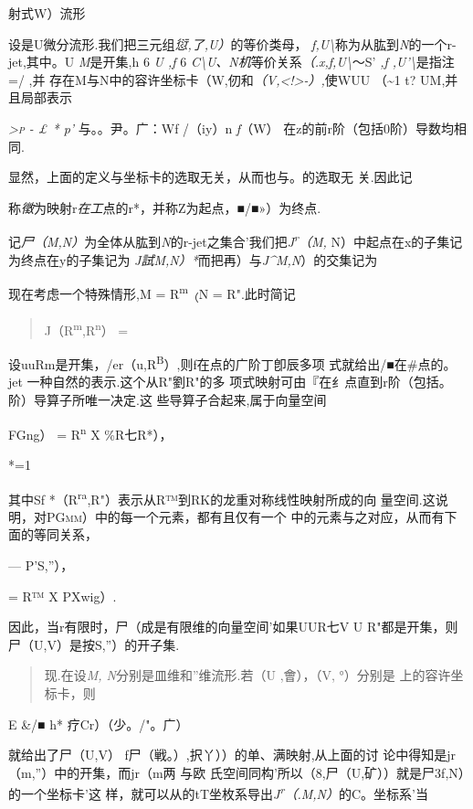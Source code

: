 射式W）流形

设是U微分流形.我们把三元组\emph{愆,了,U）}的等价类母，
\emph{f,U\textbackslash{}}称为从肱到\emph{N}的一个r-jet,其中。U
\emph{M}是开集,h 6 \emph{U ,f} 6
\emph{C\textbackslash{}U、N机}等价关系\emph{（.x,f,U\textbackslash{}}〜S'
\emph{,f ,U'\textbackslash{}}是指注=/ ,并
存在M与N中的容许坐标卡（W,仞和\emph{（V,\textless{}!\textgreater{}-）,}使WUU
（\textasciitilde{}1 t? UM,并且局部表示

\emph{\textsc{\textgreater{}p} - £ * p'} 与。。尹。广：Wf /（iy）n
\emph{f}（W） 在z的前r阶（包括0阶）导数均相同.

显然，上面的定义与坐标卡的选取无关，从而也与。的选取无 关.因此记

称\emph{徵}为映射r\emph{在工}点的r*，并称Z为起点，■/■»）为终点.

记\emph{尸（M,N）}为全体从肱到\emph{N}的r-jet之集合'我们把\emph{J\textsuperscript{r}（M,}
N）中起点在x的子集记为终点在y的子集记为
\emph{J試M,N）*}而把再）与\emph{J\^{}M,N}）的交集记为

现在考虑一个特殊情形,M = R\textsuperscript{m}\textsubscript{（}N =
R".此时简记

\begin{quote}
J（R\textsuperscript{m},R\textsuperscript{n}） =
\end{quote}

设uuRm是开集，/er（u,R\textsuperscript{B}）,则f在点的广阶丁卽辰多项
式就给出/■在\#点的。jet 一种自然的表示.这个从R"劉R"的多
项式映射可由『在纟点直到r阶（包括。阶）导算子所唯一决定.这
些导算子合起来,属于向量空间

FGng） = R\textsuperscript{n} X \%R七R*），

*=1

其中Sf
*（R\textsuperscript{ra},R"）表示从R™到RK的龙重对称线性映射所成的向
量空间.这说明，对\textsc{PGmm）}中的每一个元素，都有且仅有一个
中的元素与之对应，从而有下面的等同关系，

--- P'S,''），

= R™ X PXwig）.

因此，当r有限时，尸（成是有限维的向量空间'如果UUR七V U
R"都是开集，则尸（U,V）是按S,''）的开子集.

\begin{quote}
现.在设\emph{M, N}分别是皿维和''维流形.若（U ,會），（V, °）分别是
上的容许坐标卡，则
\end{quote}

E \&/■ h* 疗Cr）（少。/"。广）

就给出了尸（U,V） f尸（戦。）,択丫））的单、满映射,从上面的讨
论中得知是jr（m,''）中的开集，而jr（m两 与欧
氏空间同构'所以（8,尸（U,矿））就是尸3f,N）的一个坐标卡'这
样，就可以从的tT坐枚系导出\emph{J\textsuperscript{r}（.M,N）}的C。坐标系'当

